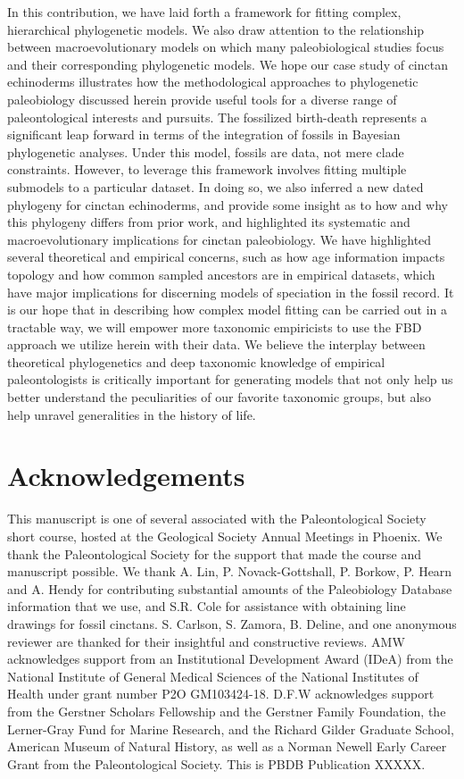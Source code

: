 \documentclass{article}
\begin{document}
In this contribution, we have laid forth a framework for fitting complex, hierarchical phylogenetic models. We also draw attention to the relationship between macroevolutionary models on which many paleobiological studies focus and their corresponding phylogenetic models. 
We hope our case study of cinctan echinoderms illustrates how the methodological approaches to phylogenetic paleobiology discussed herein provide useful tools for a diverse range of paleontological interests and pursuits. 
The fossilized birth-death represents a significant leap forward in terms of the integration of fossils in Bayesian phylogenetic analyses. 
Under this model, fossils are data, not mere clade constraints.
However, to leverage this framework involves fitting multiple submodels to a particular dataset.
In doing so, we also inferred a new dated phylogeny for cinctan echinoderms, and provide some insight as to how and why this phylogeny differs from prior work, and highlighted its systematic and macroevolutionary implications for cinctan paleobiology.
We have highlighted several theoretical and empirical concerns, such as how age information impacts topology and how common sampled ancestors are in empirical datasets, which have major implications for discerning models of speciation in the fossil record.
It is our hope that in describing how complex model fitting can be carried out in a tractable way, we will empower more taxonomic empiricists to use the FBD approach we utilize herein with their data.
We believe the interplay between theoretical phylogenetics and deep taxonomic knowledge of empirical paleontologists is critically important for generating models that not only help us better understand the peculiarities of our favorite taxonomic groups, but also help unravel generalities in the history of life.


\section{Acknowledgements}
This manuscript is one of several associated with the Paleontological Society short course, hosted at the Geological Society Annual Meetings in Phoenix. We thank the Paleontological Society for the support that made the course and manuscript possible.
We thank A. Lin, P. Novack-Gottshall, P. Borkow, P. Hearn and A. Hendy for contributing substantial amounts of the Paleobiology Database information that we use, and S.R. Cole for assistance with obtaining line drawings for fossil cinctans. S. Carlson, S. Zamora, B. Deline, and one anonymous reviewer are thanked for their insightful and constructive reviews.  AMW acknowledges  support from an Institutional Development Award (IDeA) from the National Institute of General Medical Sciences of the National Institutes of Health under grant number P2O GM103424-18. D.F.W acknowledges support from the Gerstner Scholars Fellowship and the Gerstner Family Foundation, the Lerner-Gray Fund for Marine Research, and the Richard Gilder Graduate School, American Museum of Natural History, as well as a Norman Newell Early Career Grant from the Paleontological Society.  This is PBDB Publication  XXXXX.
\end{document}
